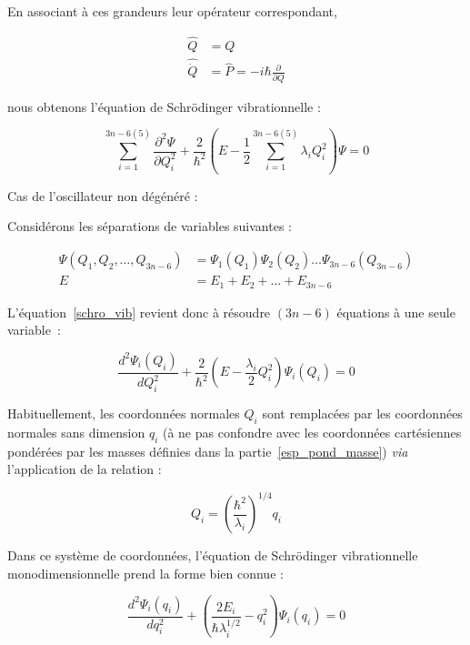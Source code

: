\documentclass[12pt,a4paper]{book}
\begin{document}
En associant à ces grandeurs leur opérateur correspondant,

\begin{align}
\hat{Q} &= Q \\
\hat{\dot{Q}} &= \hat{P} = -i\hbar \frac{\partial}{\partial Q}
\end{align}

\noindent nous obtenons l'équation de Schr\"{o}dinger vibrationnelle :

\begin{equation}
\sum^{3n-6(5)}_{i=1} \frac{\partial^2 \Psi}{\partial Q^2_i} + \frac{2}{\hbar^2}\left(E - \frac{1}{2} \sum^{3n-6(5)}_{i=1} \lambda_i Q^2_i\right) \Psi = 0
\label{schro_vib}
\end{equation}

Cas de l'oscillateur non dégénéré :

Considérons les séparations de variables suivantes :

\begin{align}
\Psi(Q_1,Q_2,\ldots,Q_{3n-6}) &= \Psi_1(Q_1) \Psi_2(Q_2)\ldots \Psi_{3n-6}(Q_{3n-6}) \\
E &= E_1 +E_2 + \ldots + E_{3n-6}
\end{align}

L'équation~\ref{schro_vib} revient donc à résoudre $(3n-6)$ équations à une seule variable~:

\begin{equation}
\frac{d^2 \Psi_i(Q_i)}{dQ^2_i} + \frac{2}{\hbar^2}\left(E - \frac{\lambda_i}{2} Q^2_i\right) \Psi_i\left(Q_i\right) = 0	
\end{equation}

Habituellement, les coordonnées normales $Q_i$ sont remplacées par les coordonnées normales sans dimension $q_i$ (à ne pas confondre avec les coordonnées cartésiennes pondérées par les masses définies dans la partie~\ref{esp_pond_masse}) \textit{via} l'application de la relation :

\begin{equation}
Q_i = \left(\frac{\hbar^2}{\lambda_i}\right)^{1/4} q_i
\end{equation}

Dans ce système de coordonnées, l'équation de Schr\"{o}dinger vibrationnelle monodimensionnelle prend la forme bien connue :

\begin{equation}
\frac{d^2 \Psi_i(q_i)}{dq^2_i} + \left(\frac{2E_i}{\hbar\lambda^{1/2}_i} - q^2_i\right) \Psi_i\left(q_i\right) = 0	
\end{equation}
\end{document}
